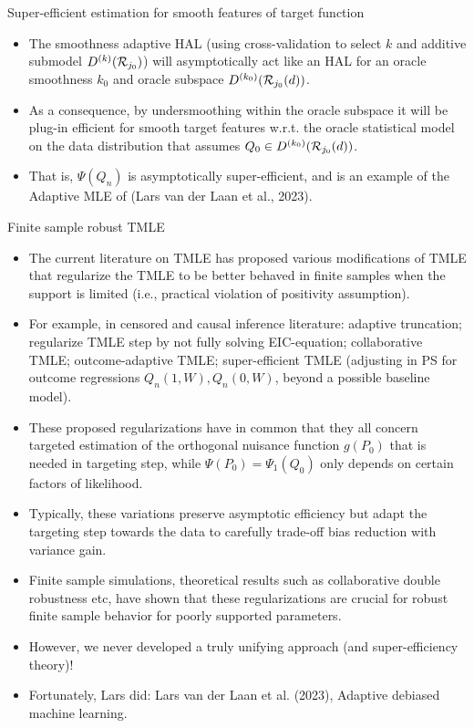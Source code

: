 \documentclass[t]{beamer}
\begin{document}
\begin{frame}{Super-efficient estimation for smooth features of target function}
\begin{itemize}
\item The smoothness adaptive HAL (using cross-validation to select $k$ and additive submodel $D^{(k)}({\cal R}_{j_0})$) will asymptotically act like an HAL for an oracle smoothness $k_0$ and oracle subspace $D^{(k_0)}({\cal R}_{j_0}(d))$.
\item As a consequence, by undersmoothing within the oracle subspace it will be plug-in efficient for smooth target features w.r.t. the oracle statistical model on the data distribution that assumes $Q_0\in D^{(k_0)}({\cal R}_{j_0}(d))$.
\item That is, $\Psi(Q_n)$ is asymptotically super-efficient, and is an example of the Adaptive MLE of  (Lars van der Laan et al., 2023).
\end{itemize}
\end{frame}

\begin{frame}{Finite sample robust TMLE}
\begin{itemize}
\item The current literature on TMLE has proposed various modifications of TMLE that regularize the TMLE to be better behaved in finite samples when the support is limited (i.e., practical violation of positivity assumption).
\item For example, in censored and causal inference literature: adaptive truncation; regularize TMLE step by not fully solving EIC-equation; collaborative TMLE; outcome-adaptive TMLE; super-efficient TMLE (adjusting in PS for outcome regressions $Q_n(1,W),Q_n(0,W)$, beyond a possible baseline model).
\item These proposed regularizations have in common that they all concern targeted estimation of the orthogonal nuisance function $g(P_0)$ that is needed in targeting step, while $\Psi(P_0)=\Psi_1(Q_0)$ only depends on certain factors of likelihood.
\end{itemize}
\end{frame}

\begin{frame}
\begin{itemize}
\item Typically, these variations preserve asymptotic efficiency but adapt the targeting step towards the data to carefully trade-off bias reduction with variance gain.
\item Finite sample simulations, theoretical results such as collaborative double robustness etc, have shown that these regularizations are crucial for robust finite sample behavior for poorly supported parameters.
\item However, we never developed a truly unifying approach (and super-efficiency theory)!
\item Fortunately, Lars did: Lars van der Laan et al. (2023), Adaptive debiased machine learning.
\end{itemize}
\end{frame}
\end{document}
